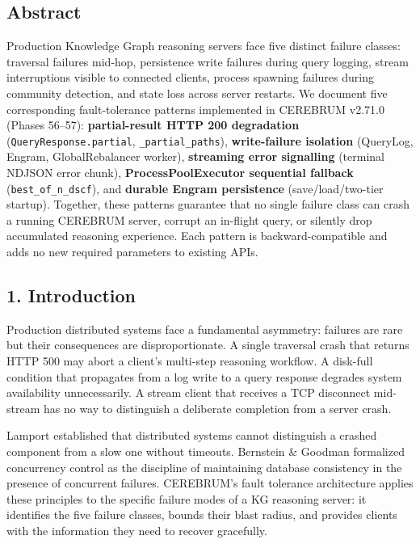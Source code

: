 
\subsection*{Abstract}
Production Knowledge Graph reasoning servers face five distinct failure classes: traversal failures mid-hop, persistence write failures during query logging, stream interruptions visible to connected clients, process spawning failures during community detection, and state loss across server restarts. We document five corresponding fault-tolerance patterns implemented in CEREBRUM v2.71.0 (Phases 56--57): \textbf{partial-result HTTP 200 degradation} (\texttt{QueryResponse.partial}, \texttt{\_partial\_paths}), \textbf{write-failure isolation} (QueryLog, Engram, GlobalRebalancer worker), \textbf{streaming error signalling} (terminal NDJSON error chunk), \textbf{ProcessPoolExecutor sequential fallback} (\texttt{best\_of\_n\_dscf}), and \textbf{durable Engram persistence} (save/load/two-tier startup). Together, these patterns guarantee that no single failure class can crash a running CEREBRUM server, corrupt an in-flight query, or silently drop accumulated reasoning experience. Each pattern is backward-compatible and adds no new required parameters to existing APIs.

\subsection*{1. Introduction}
Production distributed systems face a fundamental asymmetry: failures are rare but their consequences are disproportionate. A single traversal crash that returns HTTP 500 may abort a client's multi-step reasoning workflow. A disk-full condition that propagates from a log write to a query response degrades system availability unnecessarily. A stream client that receives a TCP disconnect mid-stream has no way to distinguish a deliberate completion from a server crash.

Lamport \cite{lamport1978} established that distributed systems cannot distinguish a crashed component from a slow one without timeouts. Bernstein \& Goodman \cite{bernstein1983} formalized concurrency control as the discipline of maintaining database consistency in the presence of concurrent failures. CEREBRUM's fault tolerance architecture applies these principles to the specific failure modes of a KG reasoning server: it identifies the five failure classes, bounds their blast radius, and provides clients with the information they need to recover gracefully.

